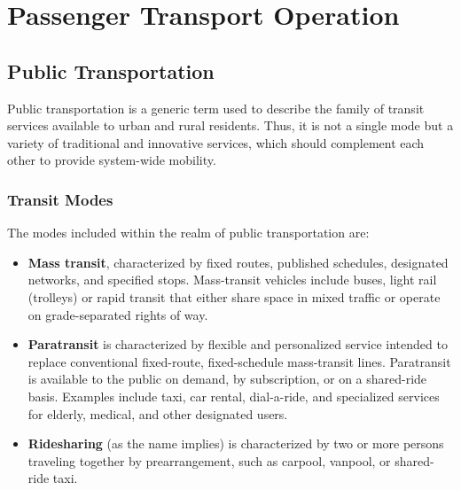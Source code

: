 \chapter{Passenger Transport Operation}
%
\section{Public Transportation}
Public transportation is a generic term used to describe the family of transit services available to urban and rural residents. Thus, it is not a single mode but a variety of traditional and innovative services, which should complement each other to provide system-wide mobility.
%
\subsection{Transit Modes}
The modes included within the realm of public transportation are:
\begin{itemize}
	\item \textbf{Mass transit}, characterized by fixed routes, published schedules, designated networks, and specified stops. Mass-transit vehicles include buses, light rail (trolleys) or rapid transit that either share space in mixed traffic or operate on grade-separated rights of way.
	\item \textbf{Paratransit} is characterized by flexible and personalized service intended to replace conventional fixed-route, fixed-schedule mass-transit lines. Paratransit is available to the public on demand, by subscription, or on a shared-ride basis. Examples include taxi, car rental, dial-a-ride, and specialized services for elderly, medical, and other designated users.
	\item \textbf{Ridesharing} (as the name implies) is characterized by two or more persons traveling together by prearrangement, such as carpool, vanpool, or shared-ride taxi.
\end{itemize}
%
